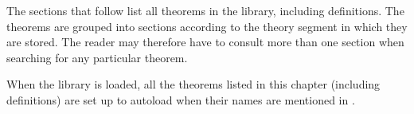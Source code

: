 \label{theorems}

The sections that follow list all theorems in the  library, including
definitions. The theorems are grouped into sections according to 
the theory segment in which they are stored.
 The reader may therefore have to consult
more than one section when searching for any particular theorem.

When the  library is loaded, all the theorems listed in this chapter
(including definitions) are set up to autoload when their names are mentioned
in \ML.

